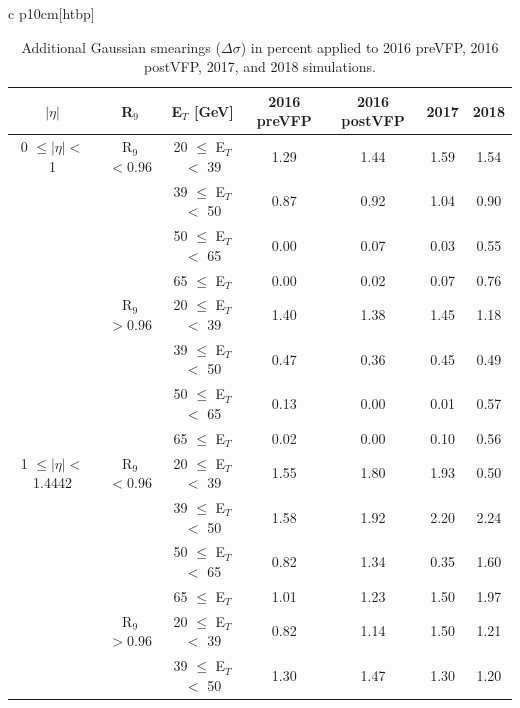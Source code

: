 \begin{table}{ c p{10cm}}[htbp]
    \centering    
    \small
    \setlength\tabcolsep{2pt}
    \caption[Additional Gaussian smearings ($\Delta\sigma$) in percent]{Additional Gaussian smearings ($\Delta\sigma$) in percent applied to 2016 preVFP, 2016 postVFP, 2017, and 2018 simulations.}
    \begin{tabular}{|c  c  c | c | c | c | c |}
    \hline
        $|\eta|$ & R$_{9}$ & E$_{T}$ [GeV] & 2016 preVFP & 2016 postVFP & 2017 & 2018\\ \hline \hline
        0 $\leq |\eta| <$ 1 & R$_{9}$ $< 0.96$ & 20 $\leq$ E$_T$ $<$ 39      & 1.29 & 1.44 & 1.59 & 1.54 \\ \hline
        &  & 39 $\leq$ E$_T$ $<$ 50                                          & 0.87 & 0.92 & 1.04 & 0.90 \\ \hline
        &  & 50 $\leq$ E$_T$ $<$ 65                                          & 0.00 & 0.07 & 0.03 & 0.55 \\ \hline
        &  & 65 $\leq$ E$_T$                                                 & 0.00 & 0.02 & 0.07 & 0.76 \\ \hline
        & R$_{9}$ $> 0.96$ & 20 $\leq$ E$_T$ $<$ 39                          & 1.40 & 1.38 & 1.45 & 1.18 \\ \hline
        &  & 39 $\leq$ E$_T$ $<$ 50                                          & 0.47 & 0.36 & 0.45 & 0.49 \\ \hline
        &  & 50 $\leq$ E$_T$ $<$ 65                                          & 0.13 & 0.00 & 0.01 & 0.57 \\ \hline
        &  & 65 $\leq$ E$_T$                                                 & 0.02 & 0.00 & 0.10 & 0.56 \\ \hline
        1 $\leq |\eta| <$ 1.4442 & R$_{9}$ $< 0.96$ & 20 $\leq$ E$_T$ $<$ 39 & 1.55 & 1.80 & 1.93 & 0.50 \\ \hline
        &  & 39 $\leq$ E$_T$ $<$ 50                                          & 1.58 & 1.92 & 2.20 & 2.24 \\ \hline
        &  & 50 $\leq$ E$_T$ $<$ 65                                          & 0.82 & 1.34 & 0.35 & 1.60 \\ \hline
        &  & 65 $\leq$ E$_T$                                                 & 1.01 & 1.23 & 1.50 & 1.97 \\ \hline
        & R$_{9}$ $> 0.96$ & 20 $\leq$ E$_T$ $<$ 39                          & 0.82 & 1.14 & 1.50 & 1.21 \\ \hline
        &  & 39 $\leq$ E$_T$ $<$ 50                                          & 1.30 & 1.47 & 1.30 & 1.20 \\ \hline

\end{tabular}
\end{table}
